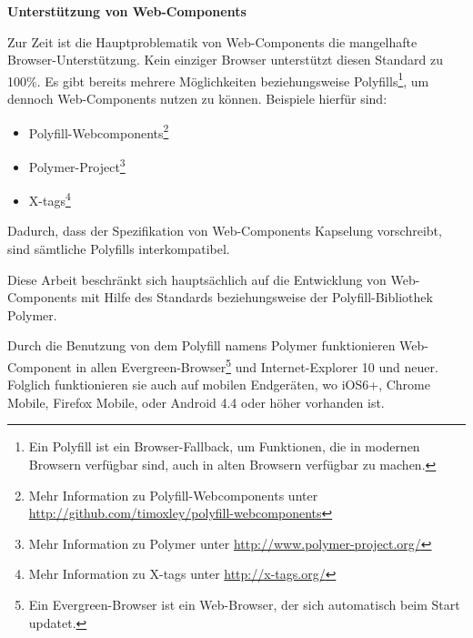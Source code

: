 \textbf{Unterstützung von Web-Components}

Zur Zeit ist die Hauptproblematik von Web-Components die mangelhafte Browser-Unterstützung. Kein einziger Browser unterstützt diesen Standard zu 100\%. Es gibt bereits mehrere Möglichkeiten beziehungsweise Polyfills\footnote{Ein Polyfill ist ein Browser-Fallback, um Funktionen, die in modernen Browsern verfügbar sind, auch in alten Browsern verfügbar zu machen.}, um dennoch Web-Components nutzen zu können. Beispiele hierfür sind:
\begin{itemize}
\item Polyfill-Webcomponents\footnote{Mehr Information zu Polyfill-Webcomponents unter \href{http://github.com/timoxley/polyfill-webcomponents}{http://github.com/timoxley/polyfill-webcomponents}}
\item Polymer-Project\footnote{Mehr Information zu Polymer unter \href{http://www.polymer-project.org/}{http://www.polymer-project.org/}}
\item X-tags\footnote{Mehr Information zu X-tags unter \href{http://x-tags.org/}{http://x-tags.org/}}
\end{itemize}

Dadurch, dass der Spezifikation von Web-Components Kapselung vorschreibt, sind sämtliche Polyfills interkompatibel.

Diese Arbeit beschränkt sich hauptsächlich auf die Entwicklung von Web-Components mit Hilfe des Standards beziehungsweise der Polyfill-Bibliothek Polymer.

Durch die Benutzung von dem Polyfill namens Polymer funktionieren Web-Component in allen \glqq Evergreen\grqq -Browser\footnote{Ein \glqq Evergreen\grqq -Browser ist ein Web-Browser, der sich automatisch beim Start updatet.} und Internet-Explorer 10 und neuer. Folglich funktionieren sie auch auf mobilen Endgeräten, wo iOS6+, Chrome Mobile, Firefox Mobile, oder Android 4.4 oder höher vorhanden ist.